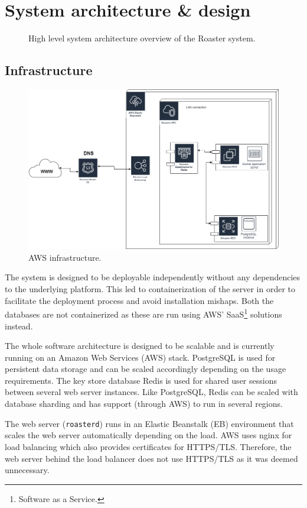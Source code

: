 \documentclass[12pt,a4paper]{report}
\begin{document}
\chapter{System architecture \& design}
\begin{figure}[H]
  \centering
  
  \caption{High level system architecture overview of the Roaster system.}
\end{figure}

\section{Infrastructure}
\begin{figure}[H]
  \centering
  \includegraphics[width=16cm]{Cloud-infrastructure.png}
  \caption{AWS infrastructure.}
\end{figure}
The system is designed to be deployable independently without any dependencies to the  underlying platform. This led to containerization of the server in order to facilitate the deployment process and avoid installation mishaps. Both the databases are not containerized as these are run using AWS' SaaS\footnote{Software as a Service.} solutions instead.

The whole software architecture is designed to be scalable and is currently running on an Amazon Web Services (AWS) stack. PostgreSQL is used for persistent data storage and can be scaled accordingly depending on the usage requirements. The key store database Redis is used for shared user sessions between several web server instances. Like PostgreSQL, Redis can be scaled with database sharding and has support (through AWS) to run in several regions.

The web server (\texttt{roasterd}) runs in an Elastic Beanstalk (EB) environment that scales the web server automatically depending on the load. AWS uses nginx for load balancing which also provides certificates for HTTPS/TLS. Therefore, the web server behind the load balancer does not use HTTPS/TLS as it was deemed unnecessary.
\end{document}
